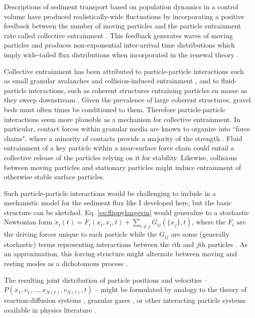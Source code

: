 Descriptions of sediment transport based on population dynamics in a control volume have produced realistically-wide fluctuations by incorporating a positive feedback between the number of moving particles and the particle entrainment rate called collective entrainment \citep{Ancey2008,Ancey2014}.
This feedback generates waves of moving particles \citep{Ancey2014, Heyman2014} and produces non-exponential inter-arrival time distributions \citep{Heyman2013} which imply wide-tailed flux distributions when incorporated in the renewal theory \citep[e.g.][]{Turowski2010,Ancey2020}.

Collective entrainment has been attributed to particle-particle interactions such as small granular avalanches and collision-induced entrainment \citep[e.g.][]{Lee2018, Pahtz2020}, and to fluid-particle interactions, such as coherent structures entraining particles en masse as they sweep downstream \citep{Ancey2014,Cameron2020}. Given the prevalence of large coherent structures, gravel beds must often times be conditioned to them. Therefore particle-particle interactions seem more plausible as a mechanism for collective entrainment. In particular, contact forces within granular media are known to organize into ``force chains", where a minority of contacts provide a majority of the strength \citep[e.g.][]{Radjai1996, Azema2012}. Fluid entrainment of a key particle within a near-surface force chain could entail a collective release of the particles relying on it for stability. Likewise, collisions between moving particles and stationary particles might induce entrainment of otherwise stable surface particles. 

Such particle-particle interactions would be challenging to include in a mechanistic model for the sediment flux like I developed here, but the basic structure can be sketched.
Eq. \ref{eq:flippylangevin} would generalize to a stochastic Newtonian form $\ddot{x}_i(t) = F_i(x_i,\dot{x}_i, t) + \sum_{i\neq j}G_{ij}(\{x_j\},t)$, where the $F_i$ are the driving forces unique to each particle while the $G_{ij}$ are some (generally stochastic) terms representing interactions between the $i$th and $j$th particles \citep{Goldstein1997}. As an approximation, this forcing structure might alternate between moving and resting modes as a dichotomous process \citep[e.g.][]{Bena2006}.

The resulting joint distribution of particle positions and velocities -- $P(x_1,v_1,\dots,x_{N(t)},v_{N(t)},t)$ -- might be formulated by analogy to the theory of reaction-diffusion systems \citep{Pechenik1999, Cardy2008}, granular gases \citep{Brilliantov2004}, or other interacting particle systems available in physics literature \citep{Hernandez2004,Escaff2018}.

